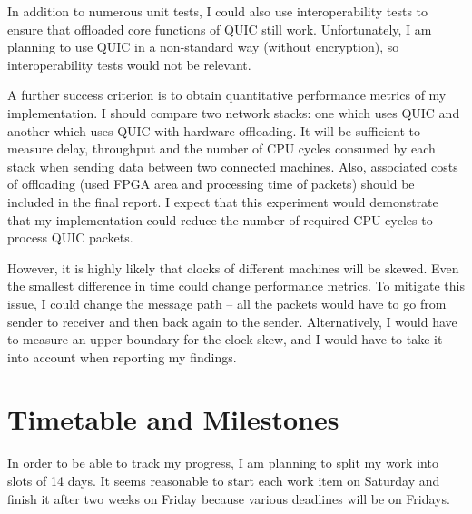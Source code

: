 \documentclass[a4paper,12pt]{article}
\begin{document}
In addition to numerous unit tests, I could also use interoperability tests to ensure that offloaded core functions of QUIC still work.
Unfortunately, I am planning to use QUIC in a non-standard way (without encryption), so interoperability tests would not be relevant.

A further success criterion is to obtain quantitative performance metrics of my implementation.
I should compare two network stacks: one which uses QUIC and another which uses QUIC with hardware offloading.
It will be sufficient to measure delay, throughput and the number of CPU cycles consumed by each stack when sending data between two connected machines. 
Also, associated costs of offloading (used FPGA area and processing time of packets) should be included in the final report.
I expect that this experiment would demonstrate that my implementation could reduce the number of required CPU cycles to process QUIC packets.

However, it is highly likely that clocks of different machines will be skewed. Even the smallest difference in time could change performance metrics. 
To mitigate this issue, I could change the message path – all the packets would have to go from sender to receiver and then back again to the sender. 
Alternatively, I would have to measure an upper boundary for the clock skew, and I would have to take it into account when reporting my findings. 




\section*{Timetable and Milestones}
In order to be able to track my progress, I am planning to split my work into slots of 14 days.
It seems reasonable to start each work item on Saturday and finish it after two weeks on Friday because various deadlines will be on Fridays.
\end{document}
